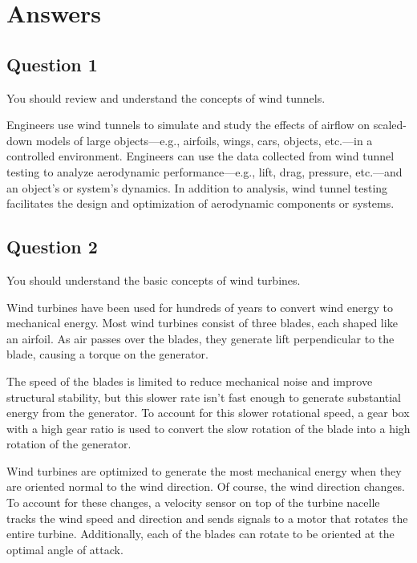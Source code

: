 \chapter{Answers}
\label{cp:answers}
\section{Question 1}

\begin{importantbox}
    You should review and understand the concepts of wind tunnels.
\end{importantbox}

Engineers use wind tunnels to simulate and study the effects of airflow on scaled-down models of large objects—e.g., airfoils, wings, cars, objects, etc.—in a controlled environment. Engineers can use the data collected from wind tunnel testing to analyze aerodynamic performance—e.g., lift, drag, pressure, etc.—and an object's or system's dynamics. In addition to analysis, wind tunnel testing facilitates the design and optimization of aerodynamic components or systems.

\section{Question 2}

\begin{importantbox}
    You should understand the basic concepts of wind turbines.
\end{importantbox}

Wind turbines have been used for hundreds of years to convert wind energy to mechanical energy. Most wind turbines consist of three blades, each shaped like an airfoil. As air passes over the blades, they generate lift perpendicular to the blade, causing a torque on the generator.

The speed of the blades is limited to reduce mechanical noise and improve structural stability, but this slower rate isn't fast enough to generate substantial energy from the generator. To account for this slower rotational speed, a gear box with a high gear ratio is used to convert the slow rotation of the blade into a high rotation of the generator.

Wind turbines are optimized to generate the most mechanical energy when they are oriented normal to the wind direction. Of course, the wind direction changes. To account for these changes, a velocity sensor on top of the turbine nacelle tracks the wind speed and direction and sends signals to a motor that rotates the entire turbine. Additionally, each of the blades can rotate to be oriented at the optimal angle of attack.